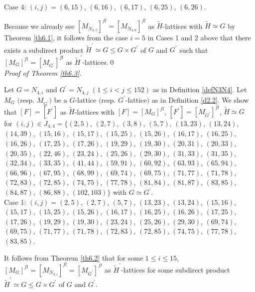\documentclass{amsart}
\theoremstyle{plain}
\theoremstyle{definition}
\theoremstyle{remark}
\newcounter{sub}\def\tr{\mbox{tr }}
\begin{document}
Case 4: $(i,j)=(6,15)$, $(6,16)$, $(6,17)$, $(6,25)$, $(6,26)$. 

Because we already see $[M_{N_{3,5}}]^{fl}=[M_{N_{3,6}}]^{fl}$ as 
$\widetilde{H}$-lattices with $\widetilde{H}\simeq G$ by Theorem \ref{th6.1}, 
it follows from the case $i=5$ in Cases 1 and 2 above 
that there exists a subdirect product 
$\widetilde{H}^\prime\simeq G\leq G\times G^\prime$ of $G$ and $G^\prime$ 
such that $[M_G]^{fl}=[M_{G^\prime}]^{fl}$ 
as $\widetilde{H}^\prime$-lattices.\qed\\

{\it Proof of Theorem \ref{th6.3}.}


Let $G=N_{4,i}$ and $G^\prime=N_{4,j}$ $(1\leq i<j\leq 152)$ 
as in Definition \ref{defN3N4}. 
Let $M_{G}$ $($resp. $M_{G^\prime}$$)$ be a $G$-lattice 
$($resp. $G^\prime$-lattice$)$ as in Definition \ref{d2.2}. 
We show that $[F]=[F^\prime]$ as $\widetilde{H}$-lattices 
with $[F]=[M_G]^{fl}$, $[F^\prime]=[M_{G^\prime}]^{fl}$, 
$\widetilde{H}\simeq G$ 
for $(i,j)\in J_{4,4}=\{(2,5)$, $(2,7)$, $(3,8)$, $(5,7)$, $(13,23)$, 
$(13,24)$, $(14,39)$, $(15,16)$, $(15,17)$, 
$(15,25)$, $(15,26)$, $(16,17)$, $(16,25)$, 
$(16,26)$, $(17,25)$, $(17,26)$, $(19,29)$, 
$(19,30)$, $(20,31)$, $(20,33)$, $(20,35)$, 
$(22,46)$, $(23,24)$, $(25,26)$, $(29,30)$, 
$(31,33)$, $(31,35)$, $(32,34)$, $(33,35)$, 
$(41,44)$, $(59,91)$, $(60,92)$, $(63,93)$, 
$(65,94)$, $(66,96)$, 
$(67,95)$, $(68,99)$, %
$(69,74)$, $(69,75)$, $(71,77)$, $(71,78)$, 
$(72,83)$, $(72,85)$, $(74,75)$, $(77,78)$, 
$(81,84)$, $(81,87)$, $(83,85)$, 
$(84,87)$, $(86,88)$, $(102,103)\}$ with $G\simeq G^\prime$.\\

Case 1: $(i,j)=(2,5)$, $(2,7)$, $(5,7)$, $(13,23)$, 
$(13,24)$,  $(15,16)$, $(15,17)$, 
$(15,25)$, $(15,26)$, $(16,17)$, $(16,25)$, 
$(16,26)$, $(17,25)$, $(17,26)$, $(19,29)$, 
$(19,30)$, $(23,24)$, $(25,26)$, $(29,30)$, 
$(69,74)$, $(69,75)$, $(71,77)$, $(71,78)$, 
$(72,83)$, $(72,85)$, $(74,75)$, $(77,78)$, $(83,85)$. 

It follows from Theorem \ref{th6.2} that for some $1\leq i\leq 15$, 
$[M_G]^{fl}=[M_{N_{3,i}}]^{fl}=[M_{G^\prime}]^{fl}$ 
as $\widetilde{H}^\prime$-lattices for some subdirect product 
$\widetilde{H}^\prime\simeq G\leq G\times G^\prime$ of $G$ and $G^\prime$.\\ 
\end{document}
